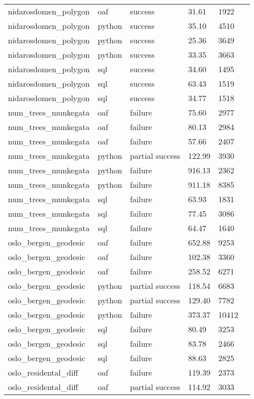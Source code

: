 \begin{longtable}{lp{1.8cm}p{1.8cm}p{1.8cm}p{1.8cm}p{1.8cm}}
nidarosdomen\_polygon & oaf & success & 31.61 & 1922 \\
nidarosdomen\_polygon & python & success & 35.10 & 4510 \\
nidarosdomen\_polygon & python & success & 25.36 & 3649 \\
nidarosdomen\_polygon & python & success & 33.35 & 3663 \\
nidarosdomen\_polygon & sql & success & 34.60 & 1495 \\
nidarosdomen\_polygon & sql & success & 63.43 & 1519 \\
nidarosdomen\_polygon & sql & success & 34.77 & 1518 \\
num\_trees\_munkegata & oaf & failure & 75.60 & 2977 \\
num\_trees\_munkegata & oaf & failure & 80.13 & 2984 \\
num\_trees\_munkegata & oaf & failure & 57.66 & 2407 \\
num\_trees\_munkegata & python & partial success & 122.99 & 3930 \\
num\_trees\_munkegata & python & failure & 916.13 & 2362 \\
num\_trees\_munkegata & python & failure & 911.18 & 8385 \\
num\_trees\_munkegata & sql & failure & 63.93 & 1831 \\
num\_trees\_munkegata & sql & failure & 77.45 & 3086 \\
num\_trees\_munkegata & sql & failure & 64.47 & 1640 \\
oslo\_bergen\_geodesic & oaf & failure & 652.88 & 9253 \\
oslo\_bergen\_geodesic & oaf & failure & 102.38 & 3360 \\
oslo\_bergen\_geodesic & oaf & failure & 258.52 & 6271 \\
oslo\_bergen\_geodesic & python & partial success & 118.54 & 6683 \\
oslo\_bergen\_geodesic & python & partial success & 129.40 & 7782 \\
oslo\_bergen\_geodesic & python & failure & 373.37 & 10412 \\
oslo\_bergen\_geodesic & sql & failure & 80.49 & 3253 \\
oslo\_bergen\_geodesic & sql & failure & 83.78 & 2466 \\
oslo\_bergen\_geodesic & sql & failure & 88.63 & 2825 \\
oslo\_residental\_diff & oaf & failure & 119.39 & 2373 \\
oslo\_residental\_diff & oaf & partial success & 114.92 & 3033 \\

\end{longtable}
